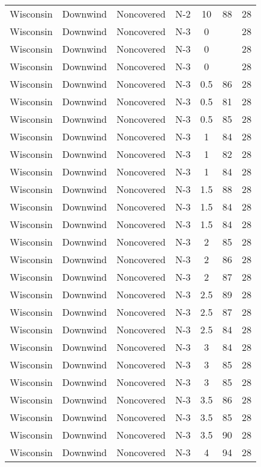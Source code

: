 \documentclass{article}
\begin{document}
\begin{longtable}[H]{ccccccc}
Wisconsin & Downwind & Noncovered & N-2 & 10   & 88  & 28 \\
Wisconsin & Downwind & Noncovered & N-3 & 0    &     & 28 \\
Wisconsin & Downwind & Noncovered & N-3 & 0    &     & 28 \\
Wisconsin & Downwind & Noncovered & N-3 & 0    &     & 28 \\
Wisconsin & Downwind & Noncovered & N-3 & 0.5  & 86  & 28 \\
Wisconsin & Downwind & Noncovered & N-3 & 0.5  & 81  & 28 \\
Wisconsin & Downwind & Noncovered & N-3 & 0.5  & 85  & 28 \\
Wisconsin & Downwind & Noncovered & N-3 & 1    & 84  & 28 \\
Wisconsin & Downwind & Noncovered & N-3 & 1    & 82  & 28 \\
Wisconsin & Downwind & Noncovered & N-3 & 1    & 84  & 28 \\
Wisconsin & Downwind & Noncovered & N-3 & 1.5  & 88  & 28 \\
Wisconsin & Downwind & Noncovered & N-3 & 1.5  & 84  & 28 \\
Wisconsin & Downwind & Noncovered & N-3 & 1.5  & 84  & 28 \\
Wisconsin & Downwind & Noncovered & N-3 & 2    & 85  & 28 \\
Wisconsin & Downwind & Noncovered & N-3 & 2    & 86  & 28 \\
Wisconsin & Downwind & Noncovered & N-3 & 2    & 87  & 28 \\
Wisconsin & Downwind & Noncovered & N-3 & 2.5  & 89  & 28 \\
Wisconsin & Downwind & Noncovered & N-3 & 2.5  & 87  & 28 \\
Wisconsin & Downwind & Noncovered & N-3 & 2.5  & 84  & 28 \\
Wisconsin & Downwind & Noncovered & N-3 & 3    & 84  & 28 \\
Wisconsin & Downwind & Noncovered & N-3 & 3    & 85  & 28 \\
Wisconsin & Downwind & Noncovered & N-3 & 3    & 85  & 28 \\
Wisconsin & Downwind & Noncovered & N-3 & 3.5  & 86  & 28 \\
Wisconsin & Downwind & Noncovered & N-3 & 3.5  & 85  & 28 \\
Wisconsin & Downwind & Noncovered & N-3 & 3.5  & 90  & 28 \\
Wisconsin & Downwind & Noncovered & N-3 & 4    & 94  & 28 \\

\end{longtable}
\end{document}

